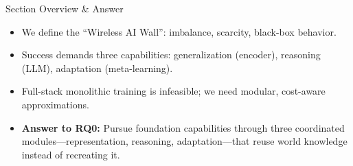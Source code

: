 \begin{frame}{Section Overview \& Answer}
    \begin{itemize}
        \item We define the ``Wireless AI Wall'': imbalance, scarcity, black-box behavior.
        \item Success demands three capabilities: generalization (encoder), reasoning (LLM), adaptation (meta-learning).
        \item Full-stack monolithic training is infeasible; we need modular, cost-aware approximations.
        \item \textbf{Answer to RQ0:} Pursue foundation capabilities through three coordinated modules—representation, reasoning, adaptation—that reuse world knowledge instead of recreating it.
    \end{itemize}
\end{frame}

